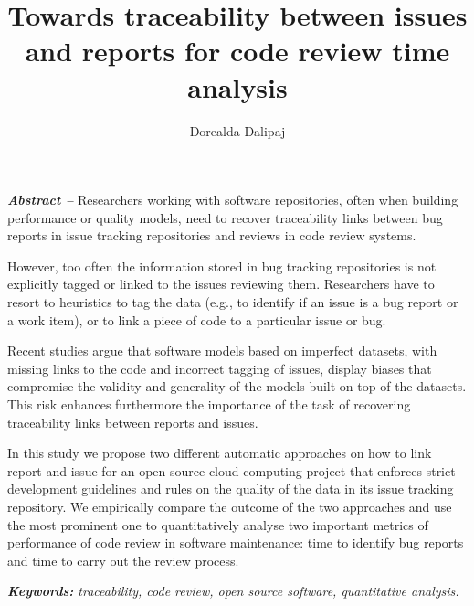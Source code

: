\documentclass{llncs}
\begin{document}
\title{Towards traceability between issues and reports for code review time analysis}
\author{Dorealda Dalipaj}
%
%
\maketitle

\textbf{\textit{Abstract --}} Researchers working with software repositories, 
often when building performance or quality models, need to recover traceability links between bug reports 
in issue tracking repositories and reviews in code review systems. 

However, too often the information stored in bug tracking repositories is not
explicitly tagged or linked to the issues reviewing them. Researchers have to
resort to heuristics to tag the data (e.g., to identify if an issue is a bug report or a work item), 
or to link a piece of code to a particular issue or bug.

Recent studies argue that software models based on imperfect datasets, with missing
links to the code and incorrect tagging of issues, display biases
that compromise the validity and generality of the models built on top of the datasets. 
This risk enhances furthermore the importance of the task of recovering 
traceability links between reports and issues. 

In this study we propose two different automatic approaches on how to link report and issue 
for an open source cloud computing project that enforces 
strict development guidelines and rules on the quality of the 
data in its issue tracking repository. We empirically compare the outcome of the two 
approaches and use the most prominent one to quantitatively analyse two important metrics of performance 
of code review in software maintenance: time to identify bug reports and time to carry out the review process.


\textit{\textbf{Keywords:} traceability, code review, open source software, quantitative analysis.}
\end{document}
